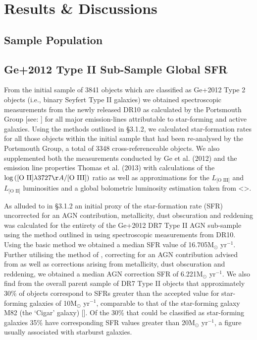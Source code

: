 \section{Results \& Discussions}
\subsection{Sample Population}
\subsection{Ge+2012 Type II Sub-Sample Global SFR}

From the initial sample of 3841 objects which are classified as Ge+2012 Type 2 objects (i.e., binary Seyfert Type II galaxies) we obtained spectroscopic measurements from the newly released DR10 as calculated by the Portsmouth Group [see: \cite{Thomas_2013}] for all major emission-lines attributable to star-forming and active galaxies. Using the methods outlined in §3.1.2, we calculated star-formation rates for all those objects within the initial sample that had been re-analysed by the Portsmouth Group, a total of 3348 cross-referenceable objects. We also supplemented both the measurements conducted by Ge et al. (2012) and the emission line properties Thomas et al. (2013) with calculations of the $\log{(\text{[O II]}{\lambda}3727{\AA}\text{/[O III]})}$ ratio as well as approximations for the $L_{\text{[O III]}}$ and $L_{\text{[O II]}}$ luminosities and a global bolometric luminosity estimation taken from <>.         

As alluded to in §3.1.2 an initial proxy of the star-formation rate (SFR) uncorrected for an AGN contribution, metallicity, dust obscuration and reddening was calculated for the entirety of the Ge+2012 DR7 Type II AGN sub-sample using the method outlined in \cite{Kennicutt_1998} using spectroscopic measurements from DR10. Using the basic \cite{Kennicutt_1998} method we obtained a median SFR value of 16.705M$_{\odot}$ yr$^{-1}$. Further utilising the method of \cite{Kewley_2004}, correcting for an AGN contribution advised from \cite{2006ApJ...642..702K} as well as corrections arising from metallicity, dust obscuration and reddening, we obtained a median AGN correction SFR of 6.221M$_{\odot}$ yr$^{-1}$. We also find from the overall parent sample of DR7 Type II objects that approximately 30\% of objects correspond to SFRs greater than the accepted value for star-forming galaxies of 10M$_{\odot}$ yr$^{-1}$, comparable to that of the star-forming galaxy M82 (the ‘Cigar’ galaxy) [\cite{2009ApJ...706.1364F}]. Of the 30\% that could be classified as star-forming galaxies 35\% have corresponding SFR values greater than 20M$_{\odot}$ yr$^{-1}$, a figure usually associated with starburst galaxies.


